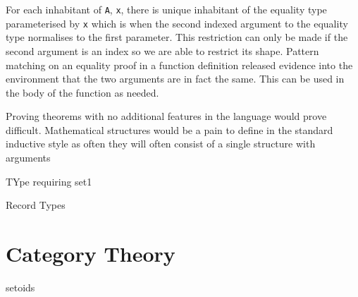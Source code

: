
For each inhabitant of \verb|A|, \verb|x|, there is unique inhabitant of the
equality type parameterised by \verb|x| which is when the second indexed
argument to the equality type normalises to the first parameter. This
restriction can only be made if the second argument is an index so we are able
to restrict its shape. Pattern matching on an equality proof in a function
definition released evidence into the environment that the two arguments are in
fact the same. This can be used in the body of the function as needed.

Proving theorems with no additional features in the language would prove
difficult. Mathematical structures would be a pain to define in the standard
inductive style as often they will often consist of a single structure with
arguments 

TYpe requiring set1

Record Types

\section{Category Theory}

setoids
